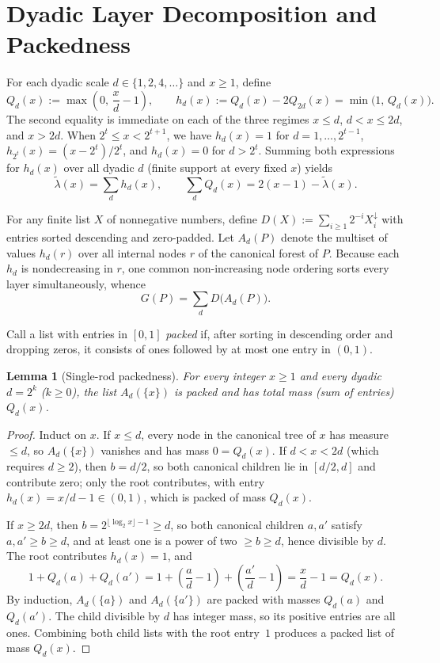 \documentclass[11pt]{article}
\theoremstyle{plain}
\newtheorem{lemma}[theorem]{Lemma}
\theoremstyle{definition}
\theoremstyle{remark}
\begin{document}
\section{Dyadic Layer Decomposition and Packedness}

For each dyadic scale $d \in \{1, 2, 4, \dots\}$ and $x \ge 1$, define
\[
Q_d(x) := \max\!\left(0,\, \frac{x}{d} - 1\right), \qquad
h_d(x) := Q_d(x) - 2Q_{2d}(x) = \min\bigl(1,\, Q_d(x)\bigr).
\]
The second equality is immediate on each of the three regimes $x \le d$, $d < x \le 2d$, and $x > 2d$. When $2^t \le x < 2^{t+1}$, we have $h_d(x) = 1$ for $d = 1, \dots, 2^{t-1}$, $h_{2^t}(x) = (x - 2^t)/2^t$, and $h_d(x) = 0$ for $d > 2^t$. Summing both expressions for $h_d(x)$ over all dyadic $d$ (finite support at every fixed $x$) yields
\begin{equation}\label{eq:dyadic-sums}
\tilde\lambda(x) = \sum_d h_d(x), \qquad
\sum_d Q_d(x) = 2(x - 1) - \tilde\lambda(x).
\end{equation}

For any finite list $X$ of nonnegative numbers, define $D(X) := \sum_{i \ge 1} 2^{-i} X_i^\downarrow$ with entries sorted descending and zero-padded. Let $A_d(P)$ denote the multiset of values $h_d(r)$ over all internal nodes $r$ of the canonical forest of $P$. Because each $h_d$ is nondecreasing in $r$, one common non-increasing node ordering sorts every layer simultaneously, whence
\begin{equation}\label{eq:layer-decomp}
G(P) = \sum_d D\bigl(A_d(P)\bigr).
\end{equation}

Call a list with entries in $[0, 1]$ \emph{packed} if, after sorting in descending order and dropping zeros, it consists of ones followed by at most one entry in $(0, 1)$.

\begin{lemma}[Single-rod packedness]\label{lem:single-packed}
For every integer $x \ge 1$ and every dyadic $d = 2^k$ ($k \ge 0$), the list $A_d(\{x\})$ is packed and has total mass (sum of entries) $Q_d(x)$.
\end{lemma}

\begin{proof}
Induct on $x$. If $x \le d$, every node in the canonical tree of $x$ has measure $\le d$, so $A_d(\{x\})$ vanishes and has mass $0 = Q_d(x)$. If $d < x < 2d$ (which requires $d \ge 2$), then $b = d/2$, so both canonical children lie in $[d/2, d]$ and contribute zero; only the root contributes, with entry $h_d(x) = x/d - 1 \in (0, 1)$, which is packed of mass $Q_d(x)$.

If $x \ge 2d$, then $b = 2^{\lfloor \log_2 x \rfloor - 1} \ge d$, so both canonical children $a, a'$ satisfy $a, a' \ge b \ge d$, and at least one is a power of two $\ge b \ge d$, hence divisible by $d$. The root contributes $h_d(x) = 1$, and
\[
1 + Q_d(a) + Q_d(a') = 1 + \left(\frac{a}{d} - 1\right) + \left(\frac{a'}{d} - 1\right) = \frac{x}{d} - 1 = Q_d(x).
\]
By induction, $A_d(\{a\})$ and $A_d(\{a'\})$ are packed with masses $Q_d(a)$ and $Q_d(a')$. The child divisible by $d$ has integer mass, so its positive entries are all ones. Combining both child lists with the root entry~$1$ produces a packed list of mass $Q_d(x)$.
\end{proof}
\end{document}
